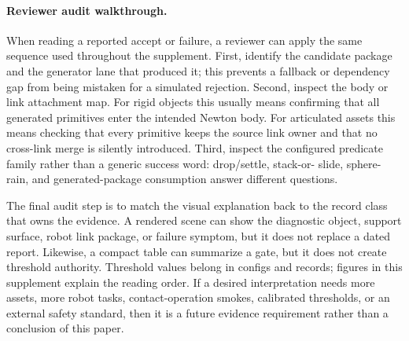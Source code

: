 \paragraph{Reviewer audit walkthrough.}
When reading a reported accept or failure, a reviewer can apply the same sequence used throughout
the supplement. First, identify the candidate package and the generator lane that produced it; this
prevents a fallback or dependency gap from being mistaken for a simulated rejection. Second, inspect
the body or link attachment map. For rigid objects this usually means confirming that all generated
primitives enter the intended Newton body. For articulated assets this means checking that every
primitive keeps the source link owner and that no cross-link merge is silently introduced. Third,
inspect the configured predicate family rather than a generic success word: drop/settle, stack-or-
slide, sphere-rain, and generated-package consumption answer different questions.

The final audit step is to match the visual explanation back to the record class that owns the
evidence. A rendered scene can show the diagnostic object, support surface, robot link package, or
failure symptom, but it does not replace a dated report. Likewise, a compact table can summarize a
gate, but it does not create threshold authority. Threshold values belong in configs and records;
figures in this supplement explain the reading order. If a desired interpretation needs more assets,
more robot tasks, contact-operation smokes, calibrated thresholds, or an external safety standard,
then it is a future evidence requirement rather than a conclusion of this paper.
